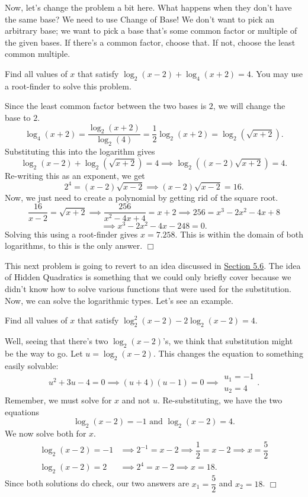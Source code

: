 \documentclass[../book.tex]{subfiles}
\begin{document}
Now, let's change the problem a bit here.  What happens when they don't have the same base?  We need to use Change of Base!  We don't want to pick an arbitrary base; we want to pick a base that's some common factor or multiple of the given bases.  If there's a common factor, choose that.  If not, choose the least common multiple.
\begin{example}
Find all values of $x$ that satisfy $\log_2(x-2)+\log_4(x+2)=4.$ You may use a root-finder to solve this problem.
\end{example}
\begin{solution}
Since the least common factor between the two bases is $2$, we will change the base to $2$.  $$\log_4(x+2)=\dfrac{\log_2(x+2)}{\log_2(4)}=\dfrac{1}{2}\log_2(x+2)=\log_2(\sqrt{x+2}).$$ Substituting this into the logarithm gives $$\log_2(x-2)+\log_2(\sqrt{x+2})=4 \implies \log_2\left((x-2)\sqrt{x+2}\right)=4.$$ Re-writing this as an exponent, we get $$2^4=(x-2)\sqrt{x-2} \implies (x-2)\sqrt{x-2}=16.$$  Now, we just need to create a polynomial by getting rid of the square root. $$\dfrac{16}{x-2}=\sqrt{x+2} \implies \dfrac{256}{x^2-4x+4}=x+2 \implies 256=x^3-2x^2-4x+8$$ $$\implies x^3-2x^2-4x-248=0.$$  Solving this using a root-finder gives $x=7.258$. This is within the domain of both logarithms, to this is the only answer. $\Box$
\end{solution}
This next problem is going to revert to an idea discussed in \hyperlink{section.5.6}{Section 5.6}.  The idea of Hidden Quadratics is something that we could only briefly cover because we didn't know how to solve various functions that were used for the substitution.  Now, we can solve the logarithmic types.  Let's see an example.
\begin{example}
Find all values of $x$ that satisfy $\log_2^2(x-2)-2\log_2(x-2)=4$.
\end{example}
\begin{solution}
Well, seeing that there's two $\log_2(x-2)$'s, we think that substitution might be the way to go.  Let $u=\log_2(x-2)$.  This changes the equation to something easily solvable: $$u^2+3u-4=0 \implies (u+4)(u-1)=0 \implies\begin{matrix} u_1=-1 \\ u_2=4 \end{matrix}.$$  Remember, we must solve for $x$ and not $u$.  Re-substituting, we have the two equations $$\log_2(x-2)=-1 \text{ and } \log_2(x-2)=4.$$  We now solve both for $x$. \begin{align*}
    \log_2(x-2)=-1 &\implies 2^{-1}=x-2 \implies \dfrac{1}{2}=x-2 \implies x=\dfrac{5}{2} \\ \log_2(x-2)=2 &\implies 2^{4}=x-2 \implies x=18.
\end{align*}
Since both solutions do check, our two answers are $x_1=\dfrac{5}{2}$ and $x_2=18$. $\Box$
\end{solution}
\end{document}
